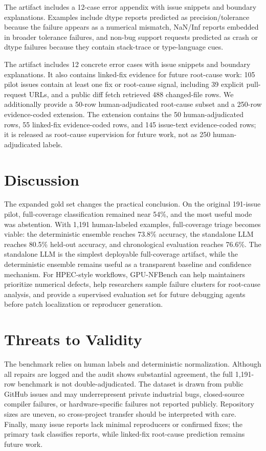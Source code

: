 \documentclass[conference]{IEEEtran}
\newcommand{\bench}{GPU-NFBench}
\begin{document}
The artifact includes a 12-case error appendix with issue snippets and
boundary explanations. Examples include dtype reports predicted as
precision/tolerance because the failure appears as a numerical mismatch,
NaN/Inf reports embedded in broader tolerance failures, and non-bug support
requests predicted as crash or dtype failures because they contain stack-trace
or type-language cues.

The artifact includes 12 concrete error cases with issue snippets and boundary
explanations. It also contains linked-fix evidence for future root-cause work:
105 pilot issues contain at least one fix or root-cause signal, including 39
explicit pull-request URLs, and a public diff fetch retrieved 488 changed-file
rows. We additionally provide a 50-row human-adjudicated root-cause subset and
a 250-row evidence-coded extension. The extension contains the 50
human-adjudicated rows, 55 linked-fix evidence-coded rows, and 145 issue-text
evidence-coded rows; it is released as root-cause supervision for future work,
not as 250 human-adjudicated labels.

\section{Discussion}

The expanded gold set changes the practical conclusion. On the original
191-issue pilot, full-coverage classification remained near 54\%, and the most
useful mode was abstention. With 1,191 human-labeled examples, full-coverage
triage becomes viable: the deterministic ensemble reaches 73.8\% accuracy, the
standalone LLM reaches 80.5\% held-out accuracy, and chronological evaluation
reaches 76.6\%. The standalone LLM is the simplest deployable full-coverage
artifact, while the deterministic ensemble remains useful as a transparent
baseline and confidence mechanism. For HPEC-style workflows, \bench{} can help
maintainers prioritize numerical defects, help researchers sample failure
clusters for root-cause analysis, and provide a supervised evaluation set for
future debugging agents before patch localization or reproducer generation.

\section{Threats to Validity}

The benchmark relies on human labels and deterministic normalization. Although
all repairs are logged and the audit shows substantial agreement, the full
1,191-row benchmark is not double-adjudicated. The dataset is drawn from public
GitHub issues and may underrepresent private industrial bugs, closed-source
compiler failures, or hardware-specific failures not reported publicly.
Repository sizes are uneven, so cross-project transfer should be interpreted
with care. Finally, many issue reports lack minimal reproducers or confirmed
fixes; the primary task classifies reports, while linked-fix root-cause
prediction remains future work.
\end{document}
